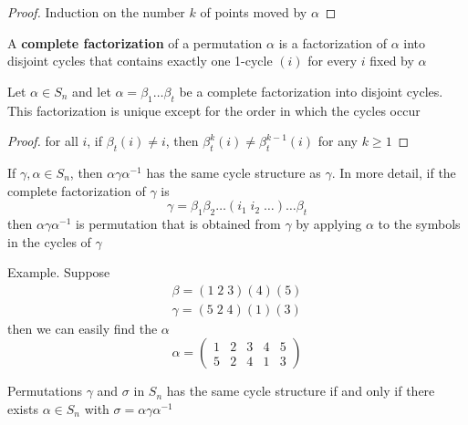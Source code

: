 \documentclass[11pt]{article}
\begin{document}
\begin{proof}
Induction on the number \(k\) of points moved by \(\alpha\)
\end{proof}

\begin{definition}[]
A \textbf{complete factorization} of a permutation \(\alpha\) is a
factorization of \(\alpha\) into disjoint cycles that contains exactly one
1-cycle \((i)\) for every \(i\) fixed by \(\alpha\)
\end{definition}

\begin{theorem}[]
Let \(\alpha\in S_n\) and let \(\alpha=\beta_1\dots\beta_t\) be a complete
factorization into disjoint cycles. This factorization is unique except for
the order in which the cycles occur
\end{theorem}

\begin{proof}
for all \(i\), if \(\beta_t(i)\neq i\), then \(\beta_t^k(i)\neq\beta_t^{k-1}(i)\)
for any \(k\ge 1\)
\end{proof}

\begin{lemma}[]
If \(\gamma,\alpha\in S_n\), then \(\alpha\gamma\alpha^{-1}\) has the same cycle
structure as \(\gamma\). In more detail, if the complete factorization of
\(\gamma\) is
\begin{equation*}
\gamma=\beta_1\beta_2\dots(i_1\; i_2\;\dots)\dots\beta_t
\end{equation*}
then \(\alpha\gamma\alpha^{-1}\) is permutation that is obtained from \(\gamma\)
by applying \(\alpha\) to the symbols in the cycles of \(\gamma\)
\end{lemma}

Example. Suppose
\begin{gather*}
\beta=(1\;2\;3)(4)(5)\\
\gamma=(5\;2\;4)(1)(3)
\end{gather*}
then we can easily find the \(\alpha\)
\begin{equation*}
\alpha=
\begin{pmatrix}
1&2&3&4&5\\
5&2&4&1&3
\end{pmatrix}
\end{equation*}
\begin{theorem}[]
Permutations \(\gamma\) and \(\sigma\) in \(S_n\) has the same cycle structure if
and only if there exists \(\alpha\in S_n\) with \(\sigma=\alpha\gamma\alpha^{-1}\)
\end{theorem}
\end{document}
